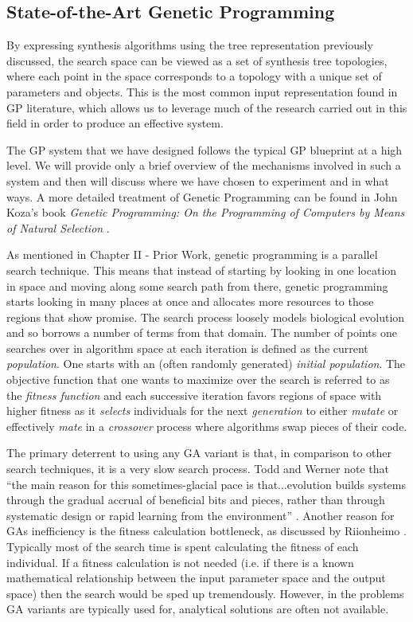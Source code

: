 \documentclass[12pt]{report} 	%
\numberwithin{figure}{chapter}
\numberwithin{table}{chapter}
\numberwithin{equation}{chapter}
\begin{document}
\begin{flushleft}
\subsection{State-of-the-Art Genetic Programming}
By expressing synthesis algorithms using the tree representation previously discussed, the search space can be viewed as a set of synthesis tree topologies, where each point in the space corresponds to a topology with a unique set of parameters and objects. This is the most common input representation found in GP literature, which allows us to leverage much of the research carried out in this field in order to produce an effective system.

The GP system that we have designed follows the typical GP blueprint at a high level. We will provide only a brief overview of the mechanisms involved in such a system and then will discuss where we have chosen to experiment and in what ways. A more detailed treatment of Genetic Programming can be found in John Koza's book \textit{Genetic Programming: On the Programming of Computers by Means of Natural Selection} \cite{Koza:1992gp}.

As mentioned in Chapter II - Prior Work, genetic programming is a parallel search technique. This means that instead of starting by looking in one location in space and moving along some search path from there, genetic programming starts looking in many places at once and allocates more resources to those regions that show promise. The search process loosely models biological evolution and so borrows a number of terms from that domain. The number of points one searches over in algorithm space at each iteration is defined as the current \textit{population}. One starts with an (often randomly generated) \textit{initial population}. The objective function that one wants to maximize over the search is referred to as the \textit{fitness function} and each successive iteration favors regions of space with higher fitness as it \textit{selects} individuals for the next \textit{generation} to either \textit{mutate} or effectively \textit{mate} in a  \textit{crossover} process where algorithms swap pieces of their code.

The primary deterrent to using any GA variant is that, in comparison to other search techniques, it is a very slow search process. Todd and Werner note that ``the main reason for this sometimes-glacial pace is that...evolution builds systems through the gradual accrual of beneficial bits and pieces, rather than through systematic design or rapid learning from the environment'' \cite[p. 5]{Todd:1998tg}. Another reason for GAs inefficiency is the fitness calculation bottleneck, as discussed by Riionheimo \cite[p.10]{Riionheimo:2003qo}. Typically most of the search time is spent calculating the fitness of each individual. If a fitness calculation is not needed (i.e. if there is a known mathematical relationship between the input parameter space and the output space) then the search would be sped up tremendously. However, in the problems GA variants are typically used for, analytical solutions are often not available.


\end{flushleft}
\end{document}
